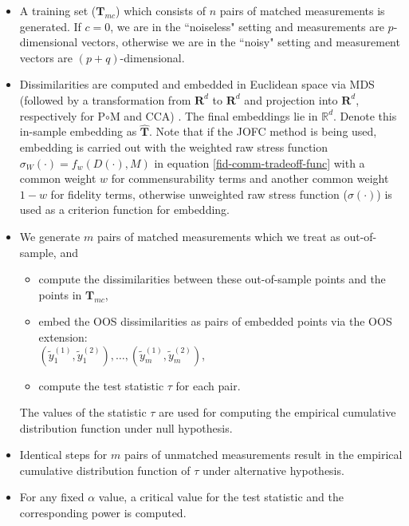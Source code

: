 \documentclass[11pt]{article} %
\begin{document}
\begin{itemize}
\item A training set ($\mathbf{T}_{mc}$) which consists of  $n$ pairs of matched measurements is generated.  If $c=0$, we are in the ``noiseless" setting and measurements are $p$-dimensional vectors, otherwise we are in the ``noisy" setting and measurement vectors are $(p+q)$-dimensional.
\item Dissimilarities are computed and embedded in  Euclidean space  via MDS (followed by a transformation from  $\mathbf{R}^d$ to  $\mathbf{R}^d$ and  projection into $\mathbf{R}^d$, respectively  for P$\circ$M and CCA) . The final embeddings lie in $\mathbb{R}^d$.   Denote this in-sample embedding as   $\hat{\mathbf{T}}$. Note that  if the JOFC method is being used, embedding is carried out with the weighted raw stress function $\sigma_{W}(\cdot)=f_{w}(D(\cdot),M)$ in equation \eqref{fid-comm-tradeoff-func} with a common weight $w$ for commensurability terms and another common weight $1-w$ for fidelity terms, otherwise unweighted raw stress function ($\sigma(\cdot)$) is used as a criterion function for embedding.

\item We generate $m$ pairs of matched   measurements  which we treat as out-of-sample, and 
\begin{itemize}
\item compute the dissimilarities  %
 between these out-of-sample  points and the points in ${\mathbf{T}_{mc}}$,  
\item  embed the OOS dissimilarities as pairs of embedded points via the OOS extension:\\
 $(\tilde{y}_1^{(1)},\tilde{y}_1^{(2)}),\ldots, (\tilde{y}_m^{(1)},\tilde{y}_m^{(2)})$, 
\item compute the test statistic $\tau$ for each pair.%
\end{itemize}
 The values of the statistic $\tau$ are used for computing  the empirical cumulative distribution function under null hypothesis. 

\item Identical steps for $m$ pairs of unmatched measurements result in the empirical cumulative distribution  function of $\tau$ under alternative hypothesis.
\item For any fixed $\alpha$ value, a critical value for the test statistic and the corresponding power is computed.
\end{itemize}
\end{document}
